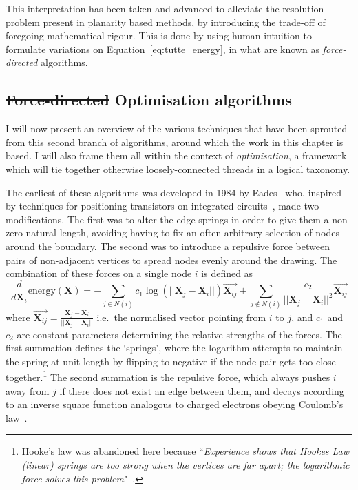 This interpretation has been taken and advanced to alleviate the resolution problem present in planarity based methods, by introducing the trade-off of foregoing mathematical rigour. 
This is done by using human intuition to formulate variations on Equation~\eqref{eq:tutte_energy}, in what are known as \emph{force-directed} algorithms.

\subsection{\texorpdfstring{\st{Force-directed}{ Optimisation algorithms}}{}}
I will now present an overview of the various techniques that have been sprouted from this second branch of algorithms, around which the work in this chapter is based. I will also frame them all within the context of \emph{optimisation}, a framework which will tie together otherwise loosely-connected threads in a logical taxonomy. 

The earliest of these algorithms was developed in 1984 by Eades~\cite{TODO} who, inspired by techniques for positioning transistors on integrated circuits~\cite{VLSI}, made two modifications. The first was to alter the edge springs in order to give them a non-zero natural length, avoiding having to fix an often arbitrary selection of nodes around the boundary. The second was to introduce a repulsive force between pairs of non-adjacent vertices to spread nodes evenly around the drawing.
The combination of these forces on a single node $i$ is defined as
\begin{equation}
    \frac{d}{d\mathbf{X}_i}\mathrm{energy}(\mathbf{X}) = -\sum_{j\in N(i)}c_1\log(||\mathbf{X}_j-\mathbf{X}_i||)\overrightarrow{\mathbf{X}_{ij}}
    + \sum_{j\notin N(i)}\frac{c_2}{||\mathbf{X}_j-\mathbf{X}_i||^2}\overrightarrow{\mathbf{X}_{ij}}
\label{eq:eades}
\end{equation}
where $\overrightarrow{\mathbf{X}_{ij}} = \frac{\mathbf{X}_j-\mathbf{X}_i}{||\mathbf{X}_j-\mathbf{X}_i||}$ i.e.\ the normalised vector pointing from $i$ to $j$, and $c_1$ and $c_2$ are constant parameters determining the relative strengths of the forces. The first summation defines the `springs', where the logarithm attempts to maintain the spring at unit length by flipping to negative if the node pair gets too close together.\footnote{Hooke's law was abandoned here because ``\emph{Experience shows that Hookes Law (linear) springs are too strong when the vertices are far apart; the logarithmic force solves this problem}"~\cite{eades}.}
The second summation is the repulsive force, which always pushes $i$ away from $j$ if there does not exist an edge between them, and decays according to an inverse square function analogous to charged electrons obeying Coulomb's law~\cite{coulomb}.

